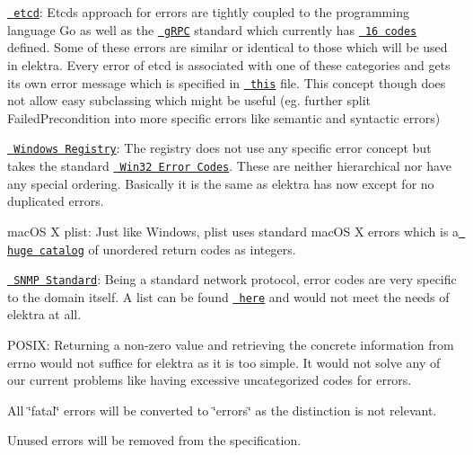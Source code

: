 \begin{DoxyItemize}
\item \href{https://github.com/etcd-io/etcd}{\texttt{ etcd}}\+: Etcd\textquotesingle{}s approach for errors are tightly coupled to the programming language Go as well as the \href{https://grpc.io/}{\texttt{ g\+R\+PC}} standard which currently has \href{https://godoc.org/google.golang.org/grpc/codes}{\texttt{ 16 codes}} defined. Some of these errors are similar or identical to those which will be used in elektra. Every error of etcd is associated with one of these categories and gets its own error message which is specified in \href{https://github.com/etcd-io/etcd/blob/master/etcdserver/api/v3rpc/rpctypes/error.go}{\texttt{ this}} file. This concept though does not allow easy subclassing which might be useful (eg. further split Failed\+Precondition into more specific errors like semantic and syntactic errors)
\item \href{https://docs.microsoft.com/en-us/windows/desktop/sysinfo/registry}{\texttt{ Windows Registry}}\+: The registry does not use any specific error concept but takes the standard \href{https://docs.microsoft.com/en-us/openspecs/windows_protocols/ms-erref/18d8fbe8-a967-4f1c-ae50-99ca8e491d2d}{\texttt{ Win32 Error Codes}}. These are neither hierarchical nor have any special ordering. Basically it is the same as elektra has now except for no duplicated errors.
\item mac\+OS X plist\+: Just like Windows, plist uses standard mac\+OS X errors which is a \href{http://krypted.com/lists/comprehensive-list-of-mac-os-x-error-codes/}{\texttt{ huge catalog}} of unordered return codes as integers.
\item \href{http://www.snmp.com/protocol/}{\texttt{ S\+N\+MP Standard}}\+: Being a standard network protocol, error codes are very specific to the domain itself. A list can be found \href{https://docs.microsoft.com/en-us/windows/desktop/snmp/snmp-error-codes}{\texttt{ here}} and would not meet the needs of elektra at all.
\item P\+O\+S\+IX\+: Returning a non-\/zero value and retrieving the concrete information from {\ttfamily errno} would not suffice for elektra as it is too simple. It would not solve any of our current problems like having excessive uncategorized codes for errors.
\end{DoxyItemize}

All \char`\"{}fatal\char`\"{} errors will be converted to \char`\"{}errors\char`\"{} as the distinction is not relevant.

Unused errors will be removed from the specification.

